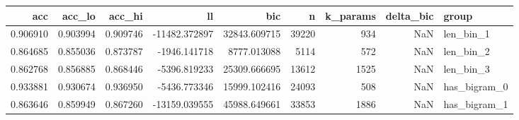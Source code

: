 \begin{tabular}{rrrrrrrrl}
\toprule
acc & acc\_lo & acc\_hi & ll & bic & n & k\_params & delta\_bic & group \\
\midrule
0.906910 & 0.903994 & 0.909746 & -11482.372897 & 32843.609715 & 39220 & 934 & NaN & len\_bin\_1 \\
0.864685 & 0.855036 & 0.873787 & -1946.141718 & 8777.013088 & 5114 & 572 & NaN & len\_bin\_2 \\
0.862768 & 0.856885 & 0.868446 & -5396.819233 & 25309.666695 & 13612 & 1525 & NaN & len\_bin\_3 \\
0.933881 & 0.930674 & 0.936950 & -5436.773346 & 15999.102416 & 24093 & 508 & NaN & has\_bigram\_0 \\
0.863646 & 0.859949 & 0.867260 & -13159.039555 & 45988.649661 & 33853 & 1886 & NaN & has\_bigram\_1 \\
\bottomrule
\end{tabular}
